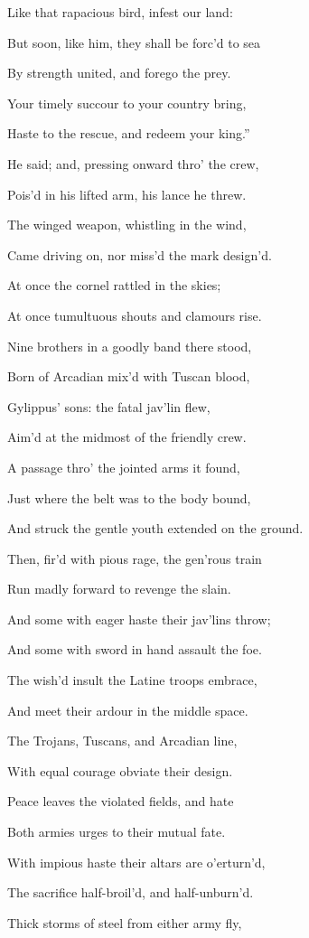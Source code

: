 Like that rapacious bird, infest our land:

But soon, like him, they shall be forc’d to sea

By strength united, and forego the prey.

Your timely succour to your country bring,

Haste to the rescue, and redeem your king.”

He said; and, pressing onward thro’ the crew,

Pois’d in his lifted arm, his lance he threw.

The winged weapon, whistling in the wind,

Came driving on, nor miss’d the mark design’d.

At once the cornel rattled in the skies;

At once tumultuous shouts and clamours rise.

Nine brothers in a goodly band there stood,

Born of Arcadian mix’d with Tuscan blood,

Gylippus’ sons: the fatal jav’lin flew,

Aim’d at the midmost of the friendly crew.

A passage thro’ the jointed arms it found,

Just where the belt was to the body bound,

And struck the gentle youth extended on the ground.

Then, fir’d with pious rage, the gen’rous train

Run madly forward to revenge the slain.

And some with eager haste their jav’lins throw;

And some with sword in hand assault the foe.

The wish’d insult the Latine troops embrace,

And meet their ardour in the middle space.

The Trojans, Tuscans, and Arcadian line,

With equal courage obviate their design.

Peace leaves the violated fields, and hate

Both armies urges to their mutual fate.

With impious haste their altars are o’erturn’d,

The sacrifice half-broil’d, and half-unburn’d.

Thick storms of steel from either army fly,

